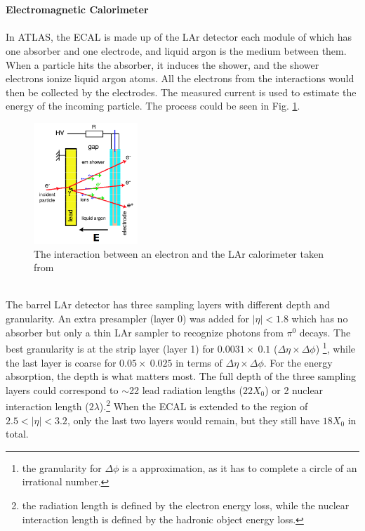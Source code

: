 \\
\\{\bf Electromagnetic Calorimeter}
\\
\\In ATLAS, the ECAL is made up of the LAr detector\cite{ATLAS:1996ab} each module of which has one absorber and one electrode, and liquid argon is the medium between them. When a particle hits the absorber, it induces the shower, and the shower electrons ionize liquid argon atoms. All the electrons from the interactions would then be collected by the electrodes. The measured current is used to estimate the energy of the incoming particle. The process could be seen in Fig. \ref{Fig:larshower}.\\
\begin{figure}[!h]                
	\includegraphics[width=0.35\textwidth]{Chapter2/LArshower}
	\centering
	\begin{center}
		\caption{The interaction between an electron and the LAr calorimeter taken from \cite{LArwork}}
		\label{Fig:larshower}            
	\end{center}
\end{figure}
\\The barrel LAr detector has three sampling layers with different depth and granularity. An extra presampler (layer 0) was added for $|\eta|<1.8$ which has no absorber but only a thin LAr sampler to recognize photons from $\pi^{0}$ decays. The best granularity is at the strip layer (layer 1) for $0.0031\times ~0.1$ ($\Delta \eta \times \Delta \phi$) \footnote{the granularity for $\Delta \phi$ is a approximation, as it has to complete a circle of an irrational number.}, while the last layer is coarse for $0.05 \times ~0.025$ in terms of $\Delta \eta \times \Delta \phi$. For the energy absorption, the depth is what matters most. The full depth of the three sampling layers could correspond to $\sim$22 lead radiation lengths ($22X_{0}$) or 2 nuclear interaction length ($2\lambda$).\footnote{the radiation length is defined by the electron energy loss, while the nuclear interaction length is defined by the hadronic object energy loss.} When the ECAL is extended to the region of $2.5<|\eta|<3.2$, only the last two layers would remain, but they still have $18X_{0}$ in total.
